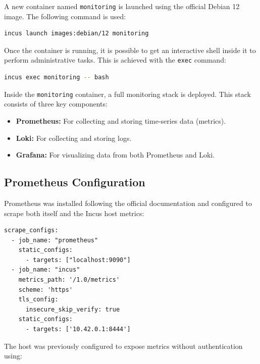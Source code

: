 A new container named \texttt{monitoring} is launched using the official Debian 12 image. The following command is used:

\begin{lstlisting}[language=bash,caption={Creating the monitoring container with a Debian 12 image.}]
incus launch images:debian/12 monitoring
\end{lstlisting}

Once the container is running, it is possible to get an interactive shell inside it to perform administrative tasks. This is achieved with the \texttt{exec} command:

\begin{lstlisting}[language=bash,caption={Obtaining a shell inside the monitoring container.}]
incus exec monitoring -- bash
\end{lstlisting}

Inside the \texttt{monitoring} container, a full monitoring stack is deployed. This stack consists of three key components:

\begin{itemize}
    \item \textbf{Prometheus:} For collecting and storing time-series data (metrics).
    \item \textbf{Loki:} For collecting and storing logs.
    \item \textbf{Grafana:} For visualizing data from both Prometheus and Loki.
\end{itemize}

\subsection*{Prometheus Configuration}

Prometheus was installed following the official documentation\cite{prometheus-getting-started} and configured to scrape both itself and the Incus host metrics:

\begin{lstlisting}[caption={Prometheus configuration to scrape metrics from itself and the Incus host.}]
scrape_configs:
  - job_name: "prometheus"
    static_configs:
      - targets: ["localhost:9090"]
  - job_name: "incus"
    metrics_path: '/1.0/metrics'
    scheme: 'https'
    tls_config:
      insecure_skip_verify: true
    static_configs:
      - targets: ['10.42.0.1:8444']
\end{lstlisting}

The host was previously configured to expose metrics without authentication using:

